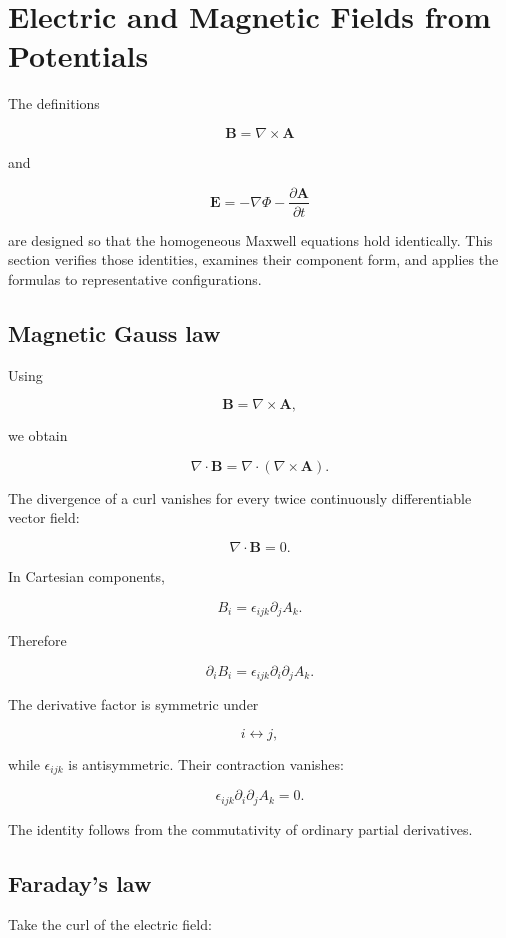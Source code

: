 \section{Electric and Magnetic Fields from Potentials}
\label{sec:fields_from_potentials}

The definitions

\[
\mathbf{B}
=
\nabla\times\mathbf{A}
\]

and

\[
\mathbf{E}
=
-\nabla\Phi
-
\frac{\partial\mathbf{A}}{\partial t}
\]

are designed so that the homogeneous Maxwell equations hold identically. This section verifies those identities, examines their component form, and applies the formulas to representative configurations.

\subsection{Magnetic Gauss law}

Using

\[
\mathbf{B}
=
\nabla\times\mathbf{A},
\]

we obtain

\[
\nabla\cdot\mathbf{B}
=
\nabla\cdot
\left(
\nabla\times\mathbf{A}
\right).
\]

The divergence of a curl vanishes for every twice continuously differentiable vector field:

\[
\boxed{
\nabla\cdot\mathbf{B}=0
}.
\]

In Cartesian components,

\[
B_i
=
\epsilon_{ijk}
\partial_jA_k.
\]

Therefore

\[
\partial_iB_i
=
\epsilon_{ijk}
\partial_i\partial_jA_k.
\]

The derivative factor is symmetric under

\[
i\longleftrightarrow j,
\]

while \(\epsilon_{ijk}\) is antisymmetric. Their contraction vanishes:

\[
\epsilon_{ijk}
\partial_i\partial_jA_k
=0.
\]

The identity follows from the commutativity of ordinary partial derivatives.

\subsection{Faraday's law}

Take the curl of the electric field:

